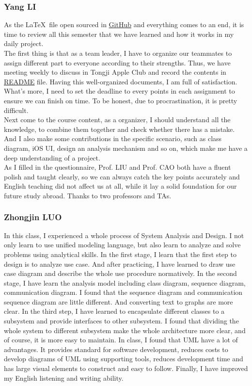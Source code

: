 \documentclass[12pt]{scrreprt}
\begin{document}
\subsubsection{Yang LI}
As the \LaTeX\ file open sourced in \href{https://github.com/zjzsliyang/OnionExpress}{GitHub} and everything comes to an end, it is time to review all this semester that we have learned and how it works in my daily project.\\
The first thing is that as a team leader, I have to organize our teammates to assign different part to everyone according to their strengths. Thus, we have meeting weekly to discuss in Tongji Apple Club and record the contents in \href{https://github.com/zjzsliyang/OnionExpress/blob/master/README.md}{README} file. Having this well-organized documents, I am full of satisfaction. What's more, I need to set the deadline to every points in each assignment to ensure we can finish on time. To be honest, due to procrastination, it is pretty difficult.\\
Next come to the course content, as a organizer, I should understand all the knowledge, to combine them together and check whether there has a mistake. And I also make some contributions in the specific scenario, such as class diagram, iOS UI, design an analysis mechanism and so on, which make me have a deep understanding of a project.\\
As I filled in the questionnaire, Prof. LIU and Prof. CAO both have a fluent polish and taught clearly, so we can always catch the key points accurately and English teaching did not affect us at all, while it lay a solid foundation for our future study abroad. Thanks to two professors and TAs.

\subsubsection{Zhongjin LUO}
In this class, I experienced a whole process of System Analysis and Design. I not only learn to use unified modeling language, but also learn to analyze and solve problems using analytical skills. In the first stage, I learn that the first step to design is to analyze use case. And after practicing, I have learned to draw use case diagram and describe the whole use procedure normatively. In the second stage, I have learn the analysis model including class diagram, sequence diagram, communication diagram. I found that the sequence diagram and communication sequence diagram are little different. And converting text to graphs are more clear. In the third step, I have learned to encapsulate different classes to a subsystem and provide  interfaces to other subsystem. I found that dividing the whole system to different subsystem make the whole architecture more clear, and of course, it is more easy to maintain. In class, I found that UML have a lot of advantages. It provides standard for software development, reduces costs to develop diagrams of UML using supporting tools, reduces development time and has large visual elements to construct and easy to follow. Finally, I have improved my English listening and writing ability. 
\end{document}
